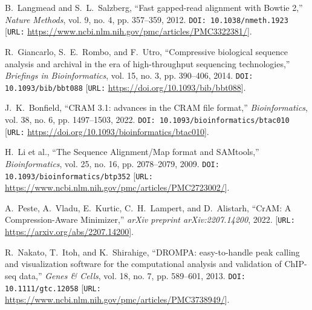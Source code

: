 \documentclass[unnumsec,webpdf,contemporary,large]{oup-authoring-template}
\theoremstyle{thmstyleone}%
\theoremstyle{thmstyletwo}%
\theoremstyle{thmstylethree}%
\begin{document}
\begin{thebibliography}{1}

B.~Langmead and S.~L.~Salzberg,
``Fast gapped-read alignment with Bowtie 2,''
\textit{Nature Methods}, vol. 9, no. 4, pp. 357--359, 2012.
\texttt{DOI: 10.1038/nmeth.1923}
[\texttt{URL:} \url{https://www.ncbi.nlm.nih.gov/pmc/articles/PMC3322381/}].

R.~Giancarlo, S.~E.~Rombo, and F.~Utro,
``Compressive biological sequence analysis and archival in the era of high-throughput sequencing technologies,''
\textit{Briefings in Bioinformatics}, vol. 15, no. 3, pp. 390--406, 2014.
\texttt{DOI: 10.1093/bib/bbt088}
[\texttt{URL:} \url{https://doi.org/10.1093/bib/bbt088}].

J.~K.~Bonfield,
``CRAM 3.1: advances in the CRAM file format,''
\textit{Bioinformatics}, vol. 38, no. 6, pp. 1497--1503, 2022.
\texttt{DOI: 10.1093/bioinformatics/btac010}
[\texttt{URL:} \url{https://doi.org/10.1093/bioinformatics/btac010}].

H.~Li et al.,
``The Sequence Alignment/Map format and SAMtools,''
\textit{Bioinformatics}, vol. 25, no. 16, pp. 2078--2079, 2009.
\texttt{DOI: 10.1093/bioinformatics/btp352}
[\texttt{URL:} \url{https://www.ncbi.nlm.nih.gov/pmc/articles/PMC2723002/}].

A.~Peste, A.~Vladu, E.~Kurtic, C.~H.~Lampert, and D.~Alistarh,
``CrAM: A Compression-Aware Minimizer,''
\textit{arXiv preprint arXiv:2207.14200}, 2022.
[\texttt{URL:} \url{https://arxiv.org/abs/2207.14200}].

R.~Nakato, T.~Itoh, and K.~Shirahige,
``DROMPA: easy-to-handle peak calling and visualization software for the computational analysis and validation of ChIP-seq data,''
\textit{Genes \& Cells}, vol. 18, no. 7, pp. 589--601, 2013.
\texttt{DOI: 10.1111/gtc.12058}
[\texttt{URL:} \url{https://www.ncbi.nlm.nih.gov/pmc/articles/PMC3738949/}].

\end{thebibliography}
\end{document}
